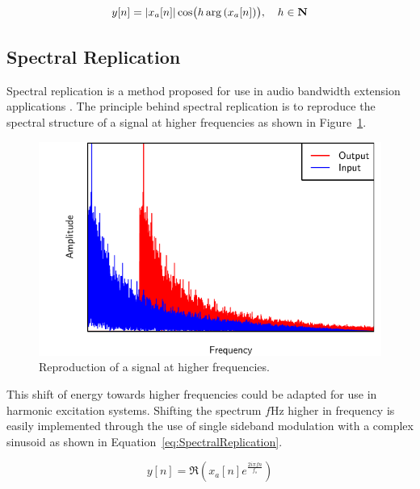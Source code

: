 		\begin{equation}
			y[n] = \left|x_{a}[n]\right| \cos \bigl( h\arg \left( x_{a}[n] \right) \bigr), \quad h \in \textbf{N}
			\label{eq:IAP}
		\end{equation}

	\subsection{Spectral Replication}
	\label{sec:Excitation-Methods-SpectralReplication}
		Spectral replication is a method proposed for use in audio bandwidth extension applications
		\citep{nagel2010a}. The principle behind spectral replication is to reproduce the spectral structure of a
		signal at higher frequencies as shown in Figure~\ref{fig:SpectralReplication}.

		\begin{figure}[h!]
			\centering
			\includegraphics{chapter3/Images/SpectralReplicationSpectrum.pdf}
			\caption{Reproduction of a signal at higher frequencies.}
			\label{fig:SpectralReplication}
		\end{figure}

		This shift of energy towards higher frequencies could be adapted for use in harmonic excitation systems.
		Shifting the spectrum $f$Hz higher in frequency is easily implemented through the use of single sideband
		modulation with a complex sinusoid as shown in Equation~\ref{eq:SpectralReplication}.

		\begin{equation}
			y[n] = \Re \left( x_{a}[n] e^{\frac{2i\pi fn}{f_{s}}} \right)
			\label{eq:SpectralReplication}
		\end{equation}


